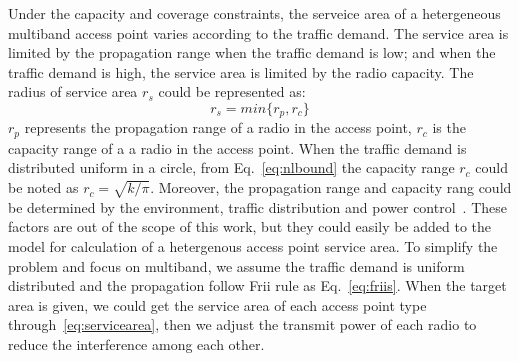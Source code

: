 

Under the capacity and coverage constraints, the serveice area of a hetergeneous multiband access point 
varies according to the traffic demand. The service area is limited by the propagation range when the traffic 
demand is low; and when the traffic demand is high, the service area is limited by the radio capacity.
The radius of service area $r_s$ could be represented as:
\begin{equation}
\label{eq:servicearea}
r_s=min\{r_p,r_c\}
\end{equation}
$r_p$ represents the propagation range of a radio in the access point, $r_c$ is the capacity range of 
a a radio in the access point. When the traffic demand is distributed uniform in a circle, from 
Eq.~\ref{eq:nlbound} the capacity range $r_c$ could be noted as $r_c=\sqrt{k/\pi}$. Moreover,
the propagation range and capacity rang could be determined by the environment, traffic distribution and
power control~\cite{robinson2010deploying}. These factors are out of the scope of this work, but they could
easily be added to the model for calculation of a hetergenous access point service area. To simplify the 
problem and focus on multiband, we assume the traffic demand is uniform distributed and the propagation 
follow Frii rule as Eq.~\ref{eq:friis}. When the target area is given, we could get the service area of
each access point type through~\ref{eq:servicearea}, then we adjust the transmit power of each radio
to reduce the interference among each other.

